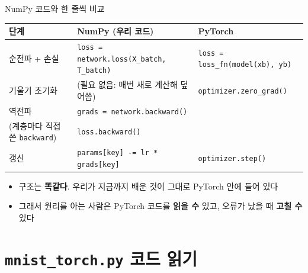 \documentclass[aspectratio=169,11pt]{beamer}
\newcommand{\code}[1]{\texttt{#1}}
\begin{document}
\begin{frame}{NumPy 코드와 한 줄씩 비교}
\centering
\small
\renewcommand{\arraystretch}{1.3}
\begin{tabular}{>{\raggedright}p{2.6cm}>{\raggedright}p{5.2cm}>{\raggedright\arraybackslash}p{4.8cm}}
\toprule
\textbf{단계} & \textbf{NumPy (우리 코드)} & \textbf{PyTorch} \\
\midrule
순전파 + 손실 & \code{loss = network.loss(X\_batch, T\_batch)} & \code{loss = loss\_fn(model(xb), yb)} \\
기울기 초기화 & (필요 없음: 매번 새로 계산해 덮어씀) & \code{optimizer.zero\_grad()} \\
역전파 & \code{grads = network.backward()}\\ (계층마다 직접 쓴 \code{backward}) & \code{loss.backward()} \\
갱신 & \code{params[key] -= lr * grads[key]} & \code{optimizer.step()} \\
\bottomrule
\end{tabular}
\vskip3mm
\raggedright
\begin{itemize}
\item 구조는 \textbf{똑같다}. 우리가 지금까지 배운 것이 그대로 PyTorch 안에 들어 있다
\item 그래서 원리를 아는 사람은 PyTorch 코드를 \textbf{읽을 수} 있고, 오류가 났을 때 \textbf{고칠 수} 있다
\end{itemize}
\end{frame}

\section{\texttt{mnist\_torch.py} 코드 읽기}
\end{document}
